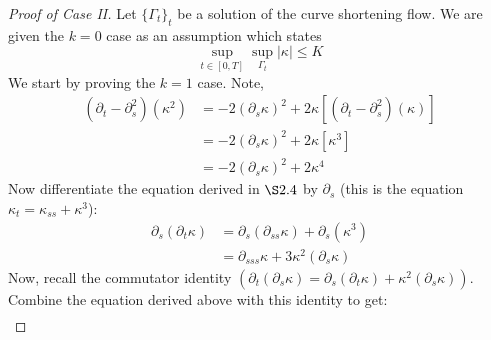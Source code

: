 \documentclass{article}
\begin{document}
\begin{proof}[Proof of Case II]
    Let $\{\Gamma_t\}_t$ be a solution of the curve shortening flow. We are given the $k=0$ case as an assumption which states
    \[ \sup_{t\in [0,T]} \sup_{\Gamma_t} |\kappa| \leq K \]
    We start by proving the $k=1$ case. Note,
    \begin{align*}
        (\partial_t - \partial_s^2)(\kappa^2) &= -2(\partial_s \kappa)^2 + 2\kappa[(\partial_t - \partial_s^2)(\kappa)] \\
            &= -2(\partial_s \kappa)^2 + 2\kappa[\kappa^3] \\
            &= -2(\partial_s \kappa)^2 + 2\kappa^4
    \end{align*}
    Now differentiate the equation derived in $\S 2.4$ by $\partial_s$ (this is the equation $\kappa_t = \kappa_{ss} + \kappa^3$):
    \begin{align*}
        \partial_s(\partial_t \kappa) &= \partial_s(\partial_{ss} \kappa) + \partial_s(\kappa^3) \\
            &= \partial_{sss} \kappa + 3\kappa^2(\partial_s \kappa)
    \end{align*}
    Now, recall the commutator identity $(\partial_t(\partial_s \kappa) = \partial_s(\partial_t \kappa) + \kappa^2(\partial_s \kappa))$. Combine the
    equation derived above with this identity to get:
    \begin{align*}
    \end{align*}
\end{proof}
\end{document}

